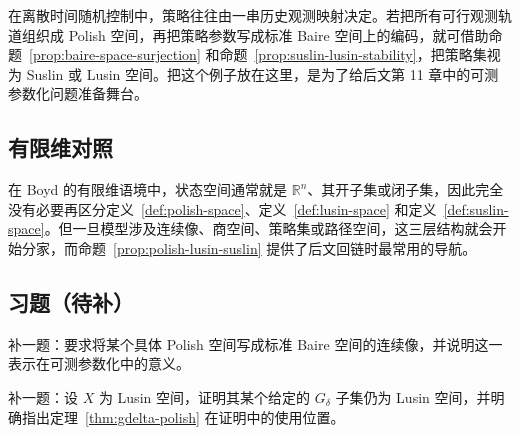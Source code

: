 \begin{example}\label{ex:policy-parameterization}
在离散时间随机控制中，策略往往由一串历史观测映射决定。若把所有可行观测轨道组织成 Polish 空间，再把策略参数写成标准 Baire 空间上的编码，就可借助命题~\ref{prop:baire-space-surjection} 和命题~\ref{prop:suslin-lusin-stability}，把策略集视为 Suslin 或 Lusin 空间。把这个例子放在这里，是为了给后文第 11 章中的可测参数化问题准备舞台。
\end{example}

\subsection*{有限维对照}

在 Boyd 的有限维语境中，状态空间通常就是 $\mathbb R^n$、其开子集或闭子集，因此完全没有必要再区分定义~\ref{def:polish-space}、定义~\ref{def:lusin-space} 和定义~\ref{def:suslin-space}。但一旦模型涉及连续像、商空间、策略集或路径空间，这三层结构就会开始分家，而命题~\ref{prop:polish-lusin-suslin} 提供了后文回链时最常用的导航。

\subsection*{习题（待补）}

\begin{exercise}\label{exr:baire-space-placeholder}
补一题：要求将某个具体 Polish 空间写成标准 Baire 空间的连续像，并说明这一表示在可测参数化中的意义。
\end{exercise}

\begin{exercise}\label{exr:lusin-placeholder}
补一题：设 $X$ 为 Lusin 空间，证明其某个给定的 $G_\delta$ 子集仍为 Lusin 空间，并明确指出定理~\ref{thm:gdelta-polish} 在证明中的使用位置。
\end{exercise}
